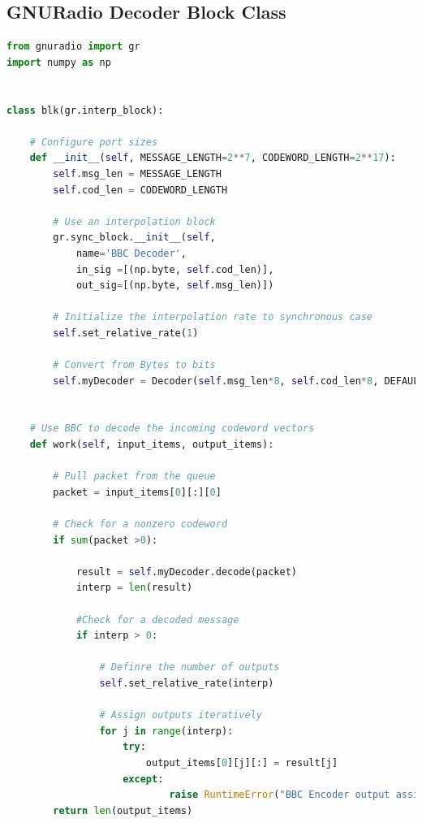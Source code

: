 \documentclass[conference]{IEEEtran}
\begin{document}
\subsection{GNURadio Decoder Block Class}
\label{GnuDecodeAppendix}
\begin{lstlisting}[language=Python]
from gnuradio import gr
import numpy as np


class blk(gr.interp_block):

    # Configure port sizes
    def __init__(self, MESSAGE_LENGTH=2**7, CODEWORD_LENGTH=2**17):
        self.msg_len = MESSAGE_LENGTH
        self.cod_len = CODEWORD_LENGTH

        # Use an interpolation block
        gr.sync_block.__init__(self,
            name='BBC Decoder',
            in_sig =[(np.byte, self.cod_len)],    
            out_sig=[(np.byte, self.msg_len)])
            
        # Initialize the interpolation rate to synchronous case
        self.set_relative_rate(1)
        
        # Convert from Bytes to bits
        self.myDecoder = Decoder(self.msg_len*8, self.cod_len*8, DEFAULT_CHECKSUM)


    # Use BBC to decode the incoming codeword vectors
    def work(self, input_items, output_items):
        
        # Pull packet from the queue
        packet = input_items[0][:][0]
        
        # Check for a nonzero codeword
        if sum(packet >0):
            
            result = self.myDecoder.decode(packet)
            interp = len(result)
            
            #Check for a decoded message
            if interp > 0:
                
                # Definre the number of outputs
                self.set_relative_rate(interp)
                
                # Assign outputs iteratively
                for j in range(interp):
                    try:
                        output_items[0][j][:] = result[j]
                    except:
                            raise RuntimeError("BBC Encoder output assignment failed")
        return len(output_items)
\end{lstlisting} 
\end{document}
